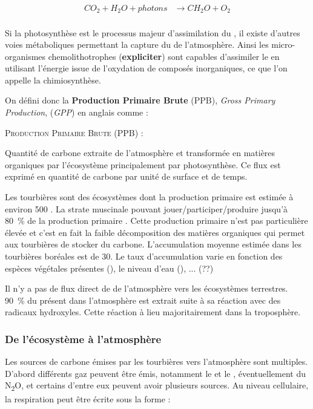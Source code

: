 $$\begin{aligned}
CO_{2} + H_{2}O + photons &\rightarrow CH_{2}O + O_{2}\\
\end{aligned} $$

Si la photosynthèse est le processus majeur d'assimilation du \coo, il existe d'autres voies métaboliques permettant la capture du \coo de l'atmosphère.
Ainsi les micro-organismes chemolithotrophes (\textbf{expliciter}) sont capables d'assimiler le \coo en utilisant l'énergie issue de l'oxydation de composés inorganiques, ce que l'on appelle la chimiosynthèse.

On défini donc la \textbf{Production Primaire Brute} (PPB), \textit{Gross Primary Production}, (\textit{GPP}) en anglais
comme :

\begin{pdef}
\textsc{Production Primaire Brute (PPB)} :

Quantité de carbone extraite de l'atmosphère et transformée en matières organiques par l'écosystème principalement par photosynthèse.
Ce flux est exprimé en quantité de carbone par unité de surface et de temps.
\end{pdef}

Les tourbières sont des écosystèmes dont la production primaire est estimée à environ \SI{500}{\gcm} \citep{francez2000}.
La strate muscinale pouvant jouer/participer/produire jusqu'à \SI{80}{\percent} de la production primaire \citep{francez2000}.
Cette production primaire n'est pas particulière élevée \plop et c'est en fait la faible décomposition des matières organiques qui permet aux tourbières de stocker du carbone.
L'accumulation moyenne estimée dans les tourbières boréales est de \SI{30}{\gcm}. Le taux d'accumulation varie en fonction des espèces végétales présentes (\plop), le niveau d'eau (\plop), ... (??)

Il n'y a pas de flux direct de \chh de l'atmosphère vers les écosystèmes terrestres.
\SI{90}{\percent} du \chh présent dans l'atmosphère est extrait suite à sa réaction avec des radicaux hydroxyles.
Cette réaction à lieu majoritairement dans la troposphère.

\subsubsection{De l'écosystème à l'atmosphère}

Les sources de carbone émises par les tourbières vers l'atmosphère sont multiples.
D'abord différents gaz peuvent être émis, notamment le \coo et le \chh, éventuellement du N\textsubscript{2}O, et certains d'entre eux peuvent avoir plusieurs sources.
Au niveau cellulaire, la respiration peut être écrite sous la forme :

